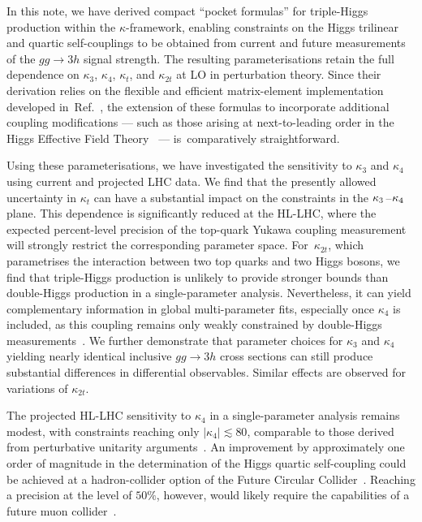 \documentclass{SciPost}
\begin{document}
In this note, we have derived compact ``pocket formulas'' for triple-Higgs production within the $\kappa$-framework, enabling constraints on the Higgs trilinear and quartic self-couplings to be obtained from current and future measurements of the $gg \to 3h$ signal strength. The resulting parameterisations retain the full dependence on $\kappa_3$, $\kappa_4$, $\kappa_t$, and $\kappa_{2t}$ at LO in perturbation theory. Since their derivation relies on the flexible and efficient matrix-element implementation developed in~Ref.~\cite{Campbell:2025llb}, the extension of these formulas to incorporate additional coupling modifications --- such as those arising at next-to-leading order in the Higgs Effective Field Theory~\cite{Brivio:2025sib} --- is~comparatively straightforward.

Using these parameterisations, we have investigated the sensitivity to $\kappa_3$ and $\kappa_4$ using current and projected LHC data. We find that the presently allowed uncertainty in $\kappa_t$ can have a substantial impact on the constraints in the $\kappa_3\hspace{0.25mm}$--$\hspace{0.25mm}\kappa_4$ plane. This dependence is significantly reduced at the HL-LHC, where the expected percent-level precision of the top-quark Yukawa coupling measurement will strongly restrict the corresponding parameter space. For~$\kappa_{2t}$, which parametrises the interaction between two top quarks and two Higgs bosons, we find that triple-Higgs production is unlikely to provide stronger bounds than double-Higgs production in a single-parameter analysis. Nevertheless, it can yield complementary information in global multi-parameter fits, especially once $\kappa_4$ is included, as this coupling remains only weakly constrained by double-Higgs measurements~\cite{Bizon:2018syu,Borowka:2018pxx,Li:2024iio,Ding:2026qto}. We further demonstrate that parameter choices for $\kappa_3$ and $\kappa_4$ yielding nearly identical inclusive $gg \to 3h$ cross sections can still produce substantial differences in differential observables. Similar effects are observed for variations of $\kappa_{2t}$.

The projected HL-LHC sensitivity to $\kappa_4$ in a single-parameter analysis remains modest, with constraints reaching only $|\kappa_4|\lesssim 80$, comparable to those derived from perturbative unitarity arguments~\cite{Liu:2018peg,Stylianou:2023xit,DiLuzio:2017tfn}. An improvement by approximately one order of magnitude in the determination of the Higgs quartic self-coupling could be achieved at a hadron-collider option of the Future Circular Collider~\cite{Papaefstathiou:2015paa,Chen:2015gva,Fuks:2015hna,Kilian:2017nio,Fuks:2017zkg,Bizon:2018syu,Papaefstathiou:2023uum,Abouabid:2024gms,Dong:2025lkm,Haisch:2025pql,Fuks:2025gjv}. Reaching a precision at the level of $50\%$, however, would likely require the capabilities of a future muon collider~\cite{Chiesa:2020awd}.
\end{document}
